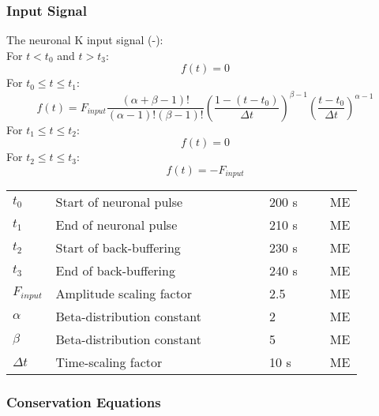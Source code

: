 \subsubsection{Input Signal} \label{sec:InputSignal}
%
The neuronal \gls{K} input signal (-):\\
%
For $ t<t_0$ and $t>t_3$:
\begin{equation}
f(t)=0
\end{equation}
%
For $ t_0 \leq t \leq t_1$:
\begin{equation}
f(t)=F_{input} \dfrac{(\alpha+\beta-1)!}{(\alpha-1)!(\beta-1)!} \left( \dfrac{1-(t-t_0)}{\Delta t}\right) ^{\beta -1} \left( \dfrac{t-t_0}{\Delta t}\right) ^{\alpha -1} 
\end{equation}
%
For $ t_1 \leq t \leq t_2$:
\begin{equation}
f(t)=0
\end{equation}
%
For $ t_2 \leq t \leq t_3$:
\begin{equation}
f(t)=-F_{input}
\end{equation}
%
\begin{table}[h!]
\centering
\begin{tabular}{| p{0.09\linewidth} | >{\footnotesize} p{0.6\linewidth} | >{\footnotesize} p{0.17\linewidth} | >{\footnotesize} p{0.02\linewidth} |}
\arrayrulecolor{lightgrey}\hline
$t_0$ 			& Start of neuronal pulse	& 200 s &  ME  \\
$t_1$ 			& End of neuronal pulse	& 210 s &  ME  \\
$t_2$ 			& Start of back-buffering	& 230 s &  ME  \\
$t_3$ 			& End of back-buffering	& 240 s &  ME  \\
$F_{input}$ 	& Amplitude scaling factor 	& 2.5 	&  ME  \\
$\alpha$ 		& Beta-distribution constant	& 2 	&  ME  \\
$\beta$ 		& Beta-distribution constant	& 5 	&  ME  \\
$\Delta t$ 		& Time-scaling factor	& 10 s	&  ME  \\
\hline
\end{tabular}
\end{table}
% 
\subsubsection{Conservation Equations}
